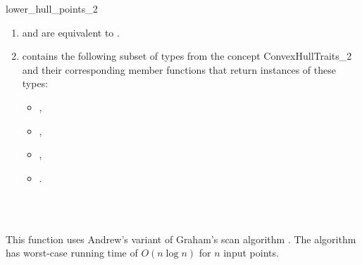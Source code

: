\begin{ccRefFunction}{lower_hull_points_2}
\begin{enumerate}
   \item    {} and 
            are equivalent to .
   \item    {} contains the following subset of types from
            the concept ConvexHullTraits\_2 and their corresponding member
            functions that return instances of these types:
            \begin{itemize}
                \item {},
                \item {}, 
                \item {},
                \item {}.
            \end{itemize}
\end{enumerate}


\ccSeeAlso

 \\
 \\

\ccImplementation

This function uses Andrew's variant of Graham's scan algorithm 
\cite{a-aeach-79,m-mdscg-84}.  The algorithm has worst-case running time 
of $O(n \log n)$ for $n$ input points.

\end{ccRefFunction}



